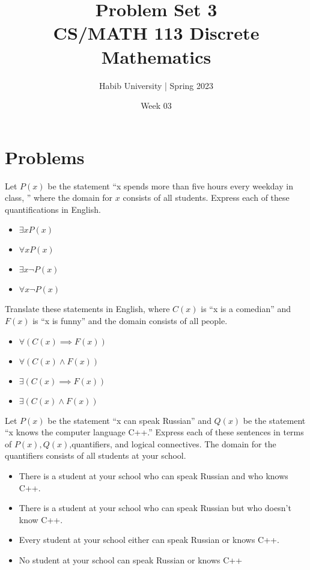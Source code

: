 \documentclass{article}
\newenvironment{problem}[2][Problem]{\begin{trivlist}
\item[\hskip \labelsep {\bfseries #1}\hskip \labelsep {\bfseries #2.}]}{\end{trivlist}}
\begin{document}
\title{Problem Set 3\\CS/MATH 113 Discrete Mathematics}
\author{Habib University | Spring 2023}
\date{Week 03}
\maketitle

\section{Problems}

\begin{problem}{1}
Let $P(x)$ be the statement ``x spends more than five hours every weekday in class, '' where the domain for $x$ consists of all students.
Express each of these quantifications in English.
\begin{itemize}
    \item[(a)] $\exists x P(x)$
    \item[(b)] $\forall x P(x)$
    \item[(c)] $\exists x \neg P(x)$
    \item[(d)] $\forall x \neg P(x)$
\end{itemize}
\end{problem}
\begin{problem}{2}
Translate these statements in English, where $C(x)$ is ``x is a comedian'' and $F(x)$ is ``x is funny'' and the domain consists of all people.
\begin{itemize}
    \item[(a)] $\forall(C(x) \implies F(x))$
    \item[(b)] $\forall(C(x) \land F(x))$
    \item[(c)] $\exists(C(x) \implies F(x))$
    \item[(d)] $\exists(C(x) \land F(x))$
\end{itemize}
\end{problem}
\begin{problem}{3}
Let $P(x)$ be the statement ``x can speak Russian'' and $Q(x)$ be the statement ``x knows the computer language C++.''
Express each of these sentences in terms of $P(x),Q(x)$,quantifiers, and logical connectives. The domain for the quantifiers consists of all students at your school.
\begin{itemize}
    \item [(a)] There is a student at your school who can speak Russian and who knows C++.
    \item [(b)] There is a student at your school who can speak Russian but who doesn’t know C++.
    \item [(c)] Every student at your school either can speak Russian or knows C++.
    \item [(d)] No student at your school can speak Russian or knows C++
\end{itemize}

\end{problem}
\end{document}
